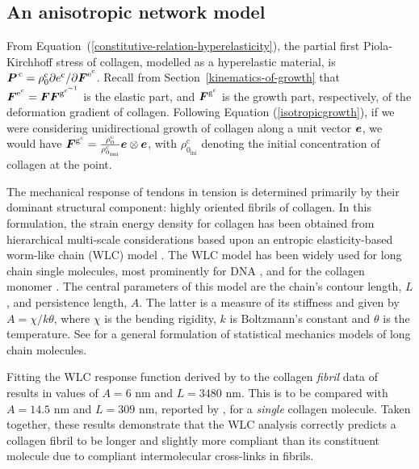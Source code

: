 \subsection{An anisotropic network model}
\label{anisotropic-network-elasticity}

From Equation~(\ref{constitutive-relation-hyperelasticity}), the
partial first Piola-Kirchhoff stress of collagen, modelled as a
hyperelastic material, is $\mbox{\boldmath$ P$}^{\,\mathrm{c}} = \rho_0^\mathrm{c}
\partial e^\mathrm{c}/ \partial\mbox{\boldmath$ F$}^{\mathrm{e}^\mathrm{c}}$. Recall
from Section~\ref{kinematics-of-growth} that
$\mbox{\boldmath$ F$}^{\mathrm{e}^\mathrm{c}} = \mbox{\boldmath$ F$}\mbox{\boldmath$ F$}^{\mathrm{g}^{\mathrm{c}^{-1}}}$
is the elastic part, and $\mbox{\boldmath$ F$}^{\mathrm{g}^\mathrm{c}}$ is the growth
part, respectively, of the deformation gradient of collagen. Following
Equation (\ref{isotropicgrowth}), if we were considering
unidirectional growth of collagen along a unit vector $\mbox{\boldmath$ e$}$, we would
have $\mbox{\boldmath$ F$}^{\mathrm{g}^\mathrm{c}} = \frac{\rho^\mathrm{c}_{0}}
{\rho^\mathrm{c}_{0_{\mathrm{ini}}}} \mbox{\boldmath$ e$} \otimes \mbox{\boldmath$ e$}$, with
$\rho^\mathrm{c}_{0_{\mathrm{ini}}}$ denoting the initial
concentration of collagen at the point.

The mechanical response of tendons in tension is determined primarily
by their dominant structural component: highly oriented fibrils of
collagen. In this formulation, the strain energy density for collagen
has been obtained from hierarchical multi-scale considerations based
upon an entropic elasticity-based worm-like chain (WLC) model
\citep{KratkyPorod:49}. The WLC model has been widely used for long
chain single molecules, most prominently for DNA
\citep{MarkoSiggia:95,Riefetal:97,Bustamanteetal:2003}, and for the
collagen mono\-mer \citep{Sunetal:2002}. The central parameters of
this model are the chain's contour length, $L$, and persistence
length, $A$. The latter is a measure of its stiffness and given by $A
= \chi/k\theta$, where $\chi$ is the bending rigidity, $k$ is
Boltzmann's constant and $\theta$ is the temperature. See
\citet{LandLif} for a general formulation of statistical mechanics
models of long chain molecules.

Fitting the WLC response function derived by \citet{MarkoSiggia:95} to
the collagen {\em fibril} data of \citet{Grahametal:2004} results in
values of $A = 6$ nm and $L = 3480$ nm. This is to be compared with
$A=14.5$ nm and $L=309$ nm, reported by \citet{Sunetal:2002}, for a
{\em single} collagen molecule. Taken together, these results
demonstrate that the WLC analysis correctly predicts a collagen fibril
to be longer and slightly more compliant than its constituent molecule
due to compliant intermolecular cross-links in fibrils.

